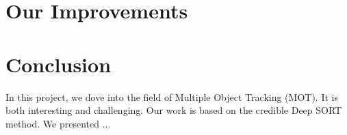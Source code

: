 \documentclass[conference]{IEEEtran}
\begin{document}


\section{Our Improvements}

\section{Conclusion}

In this project, we dove into the field of Multiple Object Tracking (MOT). It is both interesting and challenging. Our work is based on the credible Deep SORT method. We presented ...



\end{document}
